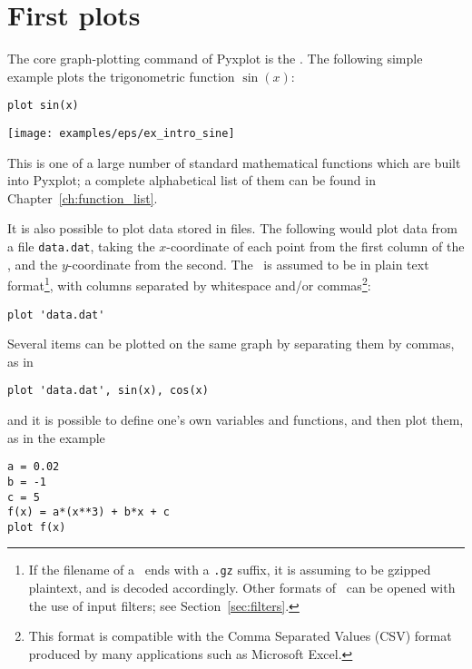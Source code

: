 \section{First plots}
\label{sec:first_plots}

The core graph-plotting command of Pyxplot is the . The following
simple example plots the trigonometric function $\sin(x)$:

\begin{verbatim}
plot sin(x)
\end{verbatim}

\begin{center}
\texttt{[image: examples/eps/ex\_intro\_sine]}
\end{center}

\noindent This is one of a large number of standard mathematical functions
which are built into Pyxplot; a complete alphabetical list of them can be found
in Chapter~\ref{ch:function_list}.

It is also possible to plot data stored in files. The following would plot data
from a file {\tt data.dat}, taking the $x$-coordinate of each point from the
first column of the \datafile, and the $y$-coordinate from the second.  The
\datafile\ is assumed to be in plain text format\footnote{If the filename of a
\datafile\ ends with a {\tt .gz} suffix, it is assuming to be gzipped
plaintext, and is decoded accordingly. Other formats of \datafile\ can be
opened with the use of input filters; see Section~\ref{sec:filters}.}, with
columns separated by whitespace and/or commas\footnote{This format is
compatible with the Comma Separated Values (CSV) format produced by many
applications such as Microsoft Excel.}:

\begin{verbatim}
plot 'data.dat'
\end{verbatim}

Several items can be plotted on the same graph by separating them by commas, as
in

\begin{verbatim}
plot 'data.dat', sin(x), cos(x)
\end{verbatim}

\noindent and it is possible to define one's own variables and functions,
and then plot them, as in the example

\begin{verbatim}
a = 0.02
b = -1
c = 5
f(x) = a*(x**3) + b*x + c
plot f(x)
\end{verbatim}

